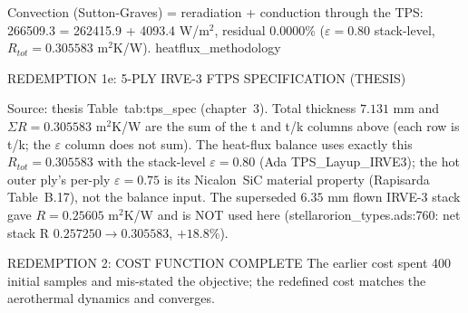 \documentclass[aspectratio=169,11pt]{beamer}
\begin{document}
  {%
   Convection (Sutton-Graves) = reradiation + conduction through the TPS:
   266509.3 = 262415.9 + 4093.4 W/m$^2$, residual 0.0000\%
   ($\varepsilon=0.80$ stack-level, $R_{tot}=0.305583$ m$^2$K/W).}
  {heatflux_methodology}

\begin{frame}{REDEMPTION 1e: 5-PLY IRVE-3 FTPS SPECIFICATION (THESIS)}
  \scriptsize
  \par\vspace{0.25cm}
  \par{\footnotesize Source: thesis Table~tab:tps\_spec (chapter~3). Total
  thickness $7.131$ mm and $\Sigma R=0.305583$ m$^2$K/W are the sum of the
  t and t/k columns above (each row is t/k; the $\varepsilon$ column does not
  sum). The heat-flux balance uses exactly this $R_{tot}=0.305583$ with the
  stack-level $\varepsilon=0.80$ (Ada TPS\_Layup\_IRVE3); the hot outer ply's
  per-ply $\varepsilon=0.75$ is its Nicalon~SiC material property
  (Rapisarda Table~B.17), not the balance input. The superseded $6.35$ mm
  flown IRVE-3 stack gave $R=0.25605$ m$^2$K/W and is NOT used here
  (stellarorion\_types.ads:760: net stack R $0.257250\to0.305583$, $+18.8\%$).}
\end{frame}
\begin{frame}{REDEMPTION 2: COST FUNCTION COMPLETE}
  The earlier cost spent 400 initial samples and mis-stated the objective;
  the redefined cost matches the aerothermal dynamics and converges.
\end{frame}
\end{document}
